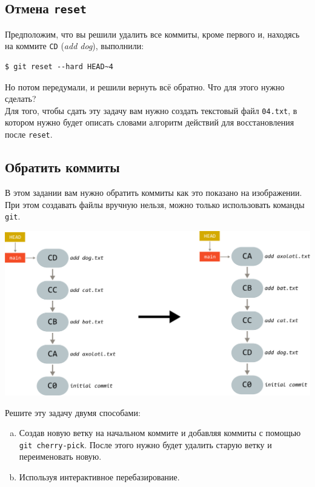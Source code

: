 \documentclass{article}
\begin{document}
\subsection{Отмена \texttt{reset}}
Предположим, что вы решили удалить все коммиты, кроме первого и, находясь на коммите \texttt{CD} (\textit{add dog}), выполнили:
\begin{lstlisting}
$ git reset --hard HEAD~4
\end{lstlisting}
Но потом передумали, и решили вернуть всё обратно. Что для этого нужно сделать?\\
Для того, чтобы сдать эту задачу вам нужно создать текстовый файл \texttt{04.txt}, в котором нужно будет описать словами алгоритм действий для восстановления после \texttt{reset}.


\subsection{Обратить коммиты}
В этом задании вам нужно обратить коммиты как это показано на изображении. При этом создавать файлы вручную нельзя, можно только использовать команды \texttt{git}.
\begin{center}
\includegraphics[scale=0.8]{../images/reverse_animals.png}
\end{center}
Решите эту задачу двумя способами:
\begin{enumerate}[(a)]
\item Создав новую ветку на начальном коммите и добавляя коммиты с помощью \texttt{git cherry-pick}. После этого нужно будет удалить старую ветку и переименовать новую.
\item Используя интерактивное перебазирование.
\end{enumerate}
\end{document}
